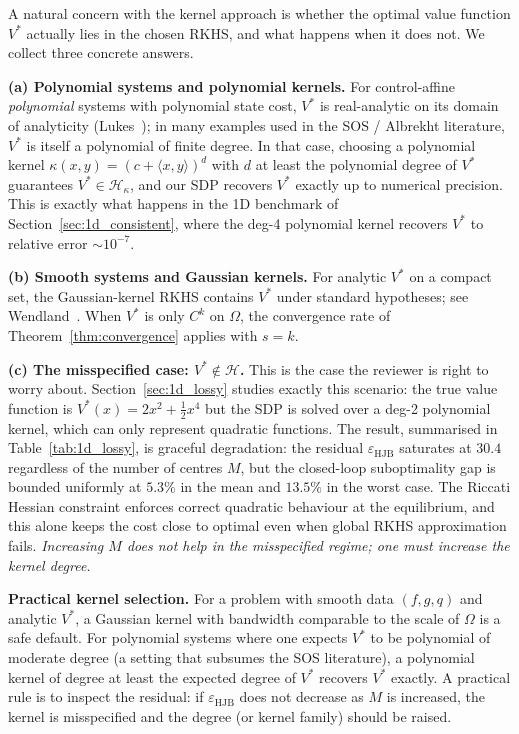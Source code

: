 \documentclass[11pt]{article}
\begin{document}
A natural concern with the kernel approach is whether the optimal value function $V^*$ actually lies in the chosen RKHS, and what happens when it does not. We collect three concrete answers.

\textbf{(a) Polynomial systems and polynomial kernels.}
For control-affine \emph{polynomial} systems with polynomial state cost, $V^*$ is real-analytic on its domain of analyticity (Lukes~\cite{lukes_1969}); in many examples used in the SOS / Albrekht literature, $V^*$ is itself a polynomial of finite degree. In that case, choosing a polynomial kernel $\kappa(x,y) = (c+\langle x,y\rangle)^d$ with $d$ at least the polynomial degree of $V^*$ guarantees $V^*\in\mathcal{H}_\kappa$, and our SDP recovers $V^*$ exactly up to numerical precision. This is exactly what happens in the 1D benchmark of Section~\ref{sec:1d_consistent}, where the deg-4 polynomial kernel recovers $V^*$ to relative error $\sim 10^{-7}$.

\textbf{(b) Smooth systems and Gaussian kernels.}
For analytic $V^*$ on a compact set, the Gaussian-kernel RKHS contains $V^*$ under standard hypotheses; see Wendland~\cite{wendland_scattered}. When $V^*$ is only $C^k$ on $\Omega$, the convergence rate of Theorem~\ref{thm:convergence} applies with $s=k$.

\textbf{(c) The misspecified case: $V^*\notin\mathcal{H}$.}
This is the case the reviewer is right to worry about. Section~\ref{sec:1d_lossy} studies exactly this scenario: the true value function is $V^*(x)=2x^2+\tfrac12 x^4$ but the SDP is solved over a deg-2 polynomial kernel, which can only represent quadratic functions. The result, summarised in Table~\ref{tab:1d_lossy}, is graceful degradation: the residual $\varepsilon_{\mathrm{HJB}}$ saturates at $30.4$ regardless of the number of centres $M$, but the closed-loop suboptimality gap is bounded uniformly at $5.3\%$ in the mean and $13.5\%$ in the worst case. The Riccati Hessian constraint enforces correct quadratic behaviour at the equilibrium, and this alone keeps the cost close to optimal even when global RKHS approximation fails. \emph{Increasing $M$ does not help in the misspecified regime; one must increase the kernel degree.}

\textbf{Practical kernel selection.} For a problem with smooth data $(f,g,q)$ and analytic $V^*$, a Gaussian kernel with bandwidth comparable to the scale of $\Omega$ is a safe default. For polynomial systems where one expects $V^*$ to be polynomial of moderate degree (a setting that subsumes the SOS literature), a polynomial kernel of degree at least the expected degree of $V^*$ recovers $V^*$ exactly. A practical rule is to inspect the residual: if $\varepsilon_{\mathrm{HJB}}$ does not decrease as $M$ is increased, the kernel is misspecified and the degree (or kernel family) should be raised.
\end{document}
